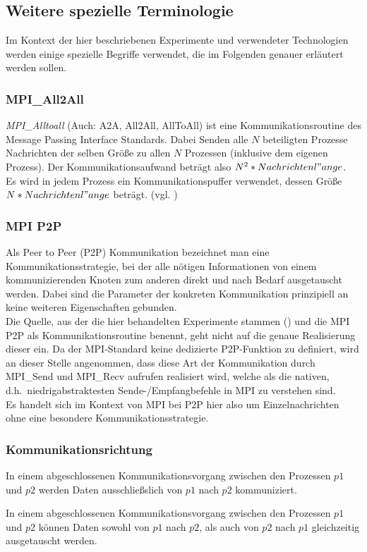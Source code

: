 \subsection{Weitere spezielle Terminologie}
Im Kontext der hier beschriebenen Experimente und verwendeter Technologien werden einige spezielle Begriffe verwendet, die im Folgenden genauer erläutert werden sollen.

\subsubsection{MPI\_All2All}
\textit{MPI\_Alltoall} (Auch: A2A, All2All, AllToAll) ist eine Kommunikationsroutine des Message Passing Interface Standards. Dabei Senden alle $N$ beteiligten Prozesse Nachrichten der selben Größe zu allen $N$ Prozessen (inklusive dem eigenen Prozess). Der Kommunikationsaufwand beträgt also $N^2 * Nachrichtenl"ange$.\\
Es wird in jedem Prozess ein Kommunikationspuffer verwendet, dessen Größe $N*Nachrichtenl"ange$ beträgt. (vgl. \cite{MPImanpage})\\

\subsubsection{MPI P2P}
Als Peer to Peer (P2P) Kommunikation bezeichnet man eine Kommunikationsstrategie, bei der alle nötigen Informationen von einem kommunizierenden Knoten zum anderen direkt und nach Bedarf ausgetauscht werden. 
Dabei sind die Parameter der konkreten Kommunikation prinzipiell an keine weiteren Eigenschaften gebunden.\\
Die Quelle, aus der die hier behandelten Experimente stammen (\cite{mainpaper}) und die MPI P2P als Kommunikationsroutine benennt, geht nicht auf die genaue Realisierung dieser ein. Da der MPI-Standard keine dedizierte P2P-Funktion zu definiert, wird an dieser Stelle angenommen, dass diese Art der Kommunikation durch MPI\_Send und MPI\_Recv aufrufen realisiert wird, welche als die nativen, d.h.~niedrigabstraktesten Sende-/Empfangbefehle in MPI zu verstehen sind.\\
Es handelt sich im Kontext von MPI bei P2P hier also um Einzelnachrichten ohne eine besondere Kommunikationsstrategie.\\

\subsubsection{Kommunikationsrichtung}
\begin{defi}
In einem abgeschlossenen Kommunikationsvorgang zwischen den Prozessen $p1$ und $p2$ werden Daten ausschließslich von $p1$ nach $p2$ kommuniziert.
\end{defi}
\begin{defi}
In einem abgeschlossenen Kommunikationsvorgang zwischen den Prozessen $p1$ und $p2$ können Daten sowohl von $p1$ nach $p2$, als auch von $p2$ nach $p1$ gleichzeitig ausgetauscht werden.
\end{defi}

